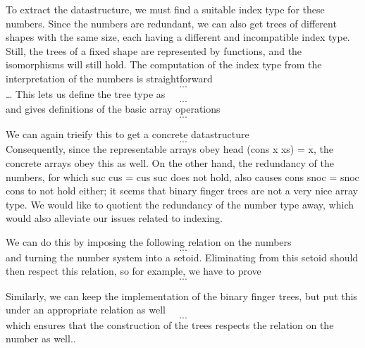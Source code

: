 To extract the datastructure, we must find a suitable index type for these numbers. Since the numbers are redundant, we can also get trees of different shapes with the same size, each having a different and incompatible index type. Still, the trees of a fixed shape are represented by functions, and the isomorphisms will still hold. The computation of the index type from the interpretation of the numbers is straightforward
\[ ... \]
\dots
This lets us define the tree type as
\[ ... \]
and gives definitions of the basic array operations
\[ ... \]

We can again trieify this to get a concrete datastructure
\[ ... \]
Consequently, since the representable arrays obey head (cons x xs) = x, the concrete arrays obey this as well.
On the other hand, the redundancy of the numbers, for which suc cus = cus suc does not hold, also causes cons snoc = snoc cons to not hold either; it seems that binary finger trees are not a very nice array type. We would like to quotient the redundancy of the number type away, which would also alleviate our issues related to indexing.

We can do this by imposing the following relation on the numbers
\[ ... \]
and turning the number system into a setoid. Eliminating from this setoid should then respect this relation, so for example, we have to prove
\[ ... \]

Similarly, we can keep the implementation of the binary finger trees, but put this under an appropriate relation as well
\[ ... \]
which ensures that the construction of the trees respects the relation on the number as well..
















